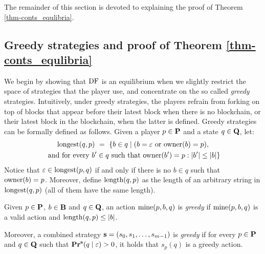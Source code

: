 The remainder of this section is devoted to explaining the proof of  Theorem \ref{thm-conts_equlibria}.


\subsection{Greedy strategies and proof of Theorem \ref{thm-conts_equlibria}} 

We begin by showing that $\text{\rm DF}$ is an equilibrium when we slightly restrict the space of strategies that the player use, and concentrate on the so called {\em greedy} strategies. Intuitively, under greedy strategies, the players refrain from forking on top of blocks that appear before their latest block when there is no blockchain, or their latest block in the blockchain, when the latter is defined. Greedy strategies can be formally defined as follows. 
Given a player $p \in \mathbf{P}$ and a state $q \in \mathbf{Q}$, let:
\begin{multline*}
{\text{\rm longest}}(q,p) \ = \ \{ b \in q \mid (b = \varepsilon \text{ or } \text{\rm owner}(b) = p),\\
\text{ and for every } b' \in q \text{ such that } \text{\rm owner}(b') = p : |b'| \leq |b|\}
\end{multline*}
Notice that $\varepsilon \in {\text{\rm longest}}(p,q)$ if and only if there is no $b \in q$ such that $\text{\rm owner}(b) = p$. Moreover, define $\text{\rm length}(q,p)$ as the length of an arbitrary string in ${\text{\rm longest}}(q,p)$ (all of them have the same length).
\begin{mydef}\label{def-greedy}
Given $p \in \mathbf{P}$, $b \in \mathbf{B}$ and $q \in \mathbf{Q}$,  an action $\text{\rm mine}(p,b,q)$ is {\em greedy} if $\text{\rm mine}(p,b,q)$ is a valid action and $\text{\rm length}(q,p) \leq |b|$.

Moreover, a combined strategy $\mathbf{s} = (s_0, s_1, \ldots, s_{m-1})$ is {\em greedy} if for every $p \in \mathbf{P}$ and  $q \in \mathbf{Q}$ such that $\mathbf{Pr}^{\mathbf{s}}(q \mid \varepsilon) > 0$, it holds that $s_p(q)$ is a greedy action.
\end{mydef}

